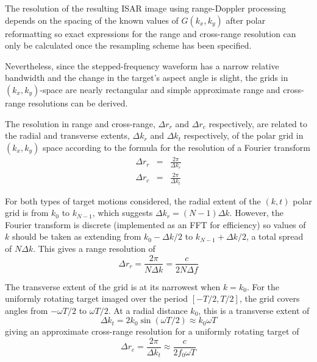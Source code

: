 The resolution of the resulting ISAR image using range-Doppler processing
depends on the spacing of the known values of $G(k_x,k_y)$ after
polar reformatting so exact expressions for the range and cross-range resolution
can only be calculated once the resampling scheme has been specified.

Nevertheless, since the stepped-frequency waveform has a narrow relative
bandwidth and the change in the target's aspect angle is slight, the grids
in $(k_x,k_y)$-space are nearly rectangular and simple approximate range and
cross-range resolutions can be derived.

The resolution in range and cross-range, $\Delta r_r$ and $\Delta r_c$
respectively, are related to the radial and transverse extents, $\Delta k_r$
and $\Delta k_t$ respectively, of the polar grid in $(k_x,k_y)$ space 
according to the formula for the resolution of a Fourier transform
\begin{eqnarray}
\Delta r_r&=&\frac{2\pi}{\Delta k_r}\\
\Delta r_c&=&\frac{2\pi}{\Delta k_t}
\end{eqnarray}

For both types of target motions considered, the radial extent of the
$(k,t)$ polar grid is from $k_0$ to $k_{N-1}$, which suggests $\Delta
k_r=(N-1)\Delta k$.  However, the Fourier transform is discrete (implemented
as an FFT for efficiency) so values of $k$ should be taken as extending from
$k_0-\Delta k/2$ to $k_{N-1}+\Delta k/2$, a total spread of $N\Delta k$. 
This gives a range resolution of 
\begin{equation}\label{ii eqn:rd drr}
\Delta r_r=\frac{2\pi}{N\Delta k}=\frac{c}{2N\Delta f}
\end{equation}

The transverse extent of the grid is at its narrowest when $k=k_0$.  For the
uniformly rotating target imaged over the period $[-T/2,T/2]$, the grid
covers angles from $-\omega T/2$ to $\omega T/2$.  At a radial distance
$k_0$, this is a transverse extent of
\begin{equation}
\Delta k_t=2k_0\sin(\omega T/2)\approx k_0\omega T
\end{equation}
giving an approximate cross-range resolution for a uniformly rotating
target of
\begin{equation}\label{ii eqn:drc rot}
\Delta r_c=\frac{2\pi}{\Delta k_t}\approx\frac{c}{2f_0\omega T}
\end{equation}

